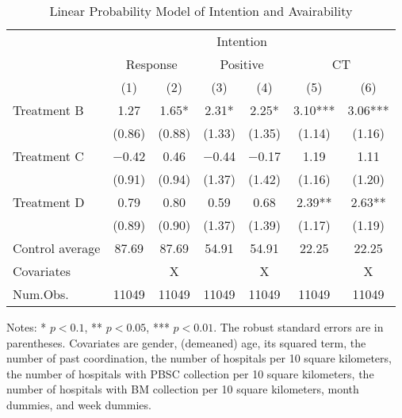 \documentclass[12pt, a4paper]{article}
\begin{document}
\begin{table}

\caption{\label{tab:stock-reg}Linear Probability Model of Intention and Avairability}
\centering
\fontsize{9}{11}\selectfont
\begin{threeparttable}
\begin{tabular}[t]{lcccccc}
\toprule
\multicolumn{3}{c}{ } & \multicolumn{2}{c}{Intention} & \multicolumn{2}{c}{ } \\
\cmidrule(l{3pt}r{3pt}){4-5}
\multicolumn{1}{c}{ } & \multicolumn{2}{c}{Response} & \multicolumn{2}{c}{Positive} & \multicolumn{2}{c}{CT} \\
\cmidrule(l{3pt}r{3pt}){2-3} \cmidrule(l{3pt}r{3pt}){4-5} \cmidrule(l{3pt}r{3pt}){6-7}
  & (1) & (2) & (3) & (4) & (5) & (6)\\
\midrule
Treatment B & \num{1.27} & \num{1.65}* & \num{2.31}* & \num{2.25}* & \num{3.10}*** & \num{3.06}***\\
 & (\num{0.86}) & (\num{0.88}) & (\num{1.33}) & (\num{1.35}) & (\num{1.14}) & (\num{1.16})\\
Treatment C & \num{-0.42} & \num{0.46} & \num{-0.44} & \num{-0.17} & \num{1.19} & \num{1.11}\\
 & (\num{0.91}) & (\num{0.94}) & (\num{1.37}) & (\num{1.42}) & (\num{1.16}) & (\num{1.20})\\
Treatment D & \num{0.79} & \num{0.80} & \num{0.59} & \num{0.68} & \num{2.39}** & \num{2.63}**\\
 & (\num{0.89}) & (\num{0.90}) & (\num{1.37}) & (\num{1.39}) & (\num{1.17}) & (\num{1.19})\\
\midrule
Control average & 87.69 & 87.69 & 54.91 & 54.91 & 22.25 & 22.25\\
Covariates &  & X &  & X &  & X\\
Num.Obs. & \num{11049} & \num{11049} & \num{11049} & \num{11049} & \num{11049} & \num{11049}\\
\bottomrule
\end{tabular}
\begin{tablenotes}
\item Notes: * $p < 0.1$, ** $p < 0.05$, *** $p < 0.01$. The robust standard errors are in parentheses. Covariates are gender, (demeaned) age, its squared term, the number of past coordination, the number of hospitals per 10 square kilometers, the number of hospitals with PBSC collection per 10 square kilometers, the number of hospitals with BM collection per 10 square kilometers, month dummies, and week dummies.
\end{tablenotes}
\end{threeparttable}
\end{table}
\end{document}
